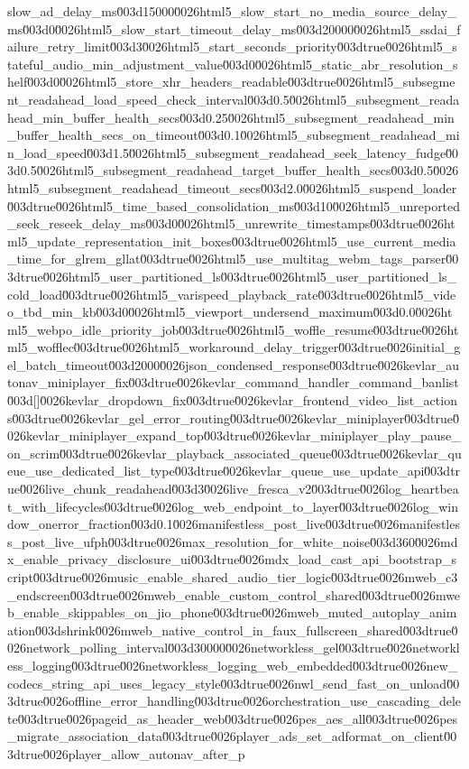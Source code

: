 {slow_ad_delay_ms\u003d15000\u0026html5_slow_start_no_media_source_delay_ms\u003d0\u0026html5_slow_start_timeout_delay_ms\u003d20000\u0026html5_ssdai_failure_retry_limit\u003d3\u0026html5_start_seconds_priority\u003dtrue\u0026html5_stateful_audio_min_adjustment_value\u003d0\u0026html5_static_abr_resolution_shelf\u003d0\u0026html5_store_xhr_headers_readable\u003dtrue\u0026html5_subsegment_readahead_load_speed_check_interval\u003d0.5\u0026html5_subsegment_readahead_min_buffer_health_secs\u003d0.25\u0026html5_subsegment_readahead_min_buffer_health_secs_on_timeout\u003d0.1\u0026html5_subsegment_readahead_min_load_speed\u003d1.5\u0026html5_subsegment_readahead_seek_latency_fudge\u003d0.5\u0026html5_subsegment_readahead_target_buffer_health_secs\u003d0.5\u0026html5_subsegment_readahead_timeout_secs\u003d2.0\u0026html5_suspend_loader\u003dtrue\u0026html5_time_based_consolidation_ms\u003d10\u0026html5_unreported_seek_reseek_delay_ms\u003d0\u0026html5_unrewrite_timestamps\u003dtrue\u0026html5_update_representation_init_boxes\u003dtrue\u0026html5_use_current_media_time_for_glrem_gllat\u003dtrue\u0026html5_use_multitag_webm_tags_parser\u003dtrue\u0026html5_user_partitioned_ls\u003dtrue\u0026html5_user_partitioned_ls_cold_load\u003dtrue\u0026html5_varispeed_playback_rate\u003dtrue\u0026html5_video_tbd_min_kb\u003d0\u0026html5_viewport_undersend_maximum\u003d0.0\u0026html5_webpo_idle_priority_job\u003dtrue\u0026html5_woffle_resume\u003dtrue\u0026html5_wofflec\u003dtrue\u0026html5_workaround_delay_trigger\u003dtrue\u0026initial_gel_batch_timeout\u003d2000\u0026json_condensed_response\u003dtrue\u0026kevlar_autonav_miniplayer_fix\u003dtrue\u0026kevlar_command_handler_command_banlist\u003d[]\u0026kevlar_dropdown_fix\u003dtrue\u0026kevlar_frontend_video_list_actions\u003dtrue\u0026kevlar_gel_error_routing\u003dtrue\u0026kevlar_miniplayer\u003dtrue\u0026kevlar_miniplayer_expand_top\u003dtrue\u0026kevlar_miniplayer_play_pause_on_scrim\u003dtrue\u0026kevlar_playback_associated_queue\u003dtrue\u0026kevlar_queue_use_dedicated_list_type\u003dtrue\u0026kevlar_queue_use_update_api\u003dtrue\u0026live_chunk_readahead\u003d3\u0026live_fresca_v2\u003dtrue\u0026log_heartbeat_with_lifecycles\u003dtrue\u0026log_web_endpoint_to_layer\u003dtrue\u0026log_window_onerror_fraction\u003d0.1\u0026manifestless_post_live\u003dtrue\u0026manifestless_post_live_ufph\u003dtrue\u0026max_resolution_for_white_noise\u003d360\u0026mdx_enable_privacy_disclosure_ui\u003dtrue\u0026mdx_load_cast_api_bootstrap_script\u003dtrue\u0026music_enable_shared_audio_tier_logic\u003dtrue\u0026mweb_c3_endscreen\u003dtrue\u0026mweb_enable_custom_control_shared\u003dtrue\u0026mweb_enable_skippables_on_jio_phone\u003dtrue\u0026mweb_muted_autoplay_animation\u003dshrink\u0026mweb_native_control_in_faux_fullscreen_shared\u003dtrue\u0026network_polling_interval\u003d30000\u0026networkless_gel\u003dtrue\u0026networkless_logging\u003dtrue\u0026networkless_logging_web_embedded\u003dtrue\u0026new_codecs_string_api_uses_legacy_style\u003dtrue\u0026nwl_send_fast_on_unload\u003dtrue\u0026offline_error_handling\u003dtrue\u0026orchestration_use_cascading_delete\u003dtrue\u0026pageid_as_header_web\u003dtrue\u0026pes_aes_all\u003dtrue\u0026pes_migrate_association_data\u003dtrue\u0026player_ads_set_adformat_on_client\u003dtrue\u0026player_allow_autonav_after_p}
